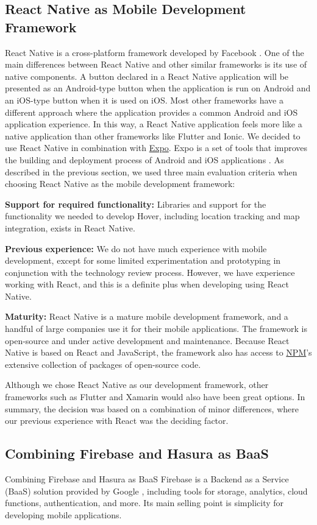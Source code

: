 \subsection{React Native as Mobile Development Framework}
React Native is a cross-platform framework developed by Facebook \citep{occhino_react_2015}. One of the main differences between React Native and other similar frameworks is its use of native components. A button declared in a React Native application will be presented as an Android-type button when the application is run on Android and an iOS-type button when it is used on iOS. Most other frameworks have a different approach where the application provides a common Android and iOS application experience. In this way, a React Native application feels more like a native application than other frameworks like Flutter and Ionic. 
We decided to use React Native in combination with \href{https://expo.io}{Expo}. Expo is a set of tools that improves the building and deployment process of Android and iOS applications \citep{vatne_introduction_2021}. As described in the previous section, we used three main evaluation criteria when choosing React Native as the mobile development framework:

\textbf{Support for required functionality:} Libraries and support for the functionality we needed to develop Hover, including location tracking and map integration, exists in React Native.

\textbf{Previous experience:} We do not have much experience with mobile development, except for some limited experimentation and prototyping in conjunction with the technology review process. However, we have experience working with React, and this is a definite plus when developing using React Native.

\textbf{Maturity:} React Native is a mature mobile development framework, and a handful of large companies use it for their mobile applications. The framework is open-source and under active development and maintenance. Because React Native is based on React and JavaScript, the framework also has access to \href{https://www.npmjs.com}{NPM}’s extensive collection of packages of open-source code.

Although we chose React Native as our development framework, other frameworks such as Flutter and Xamarin would also have been great options. In summary, the decision was based on a combination of minor differences, where our previous experience with React was the deciding factor.

\subsection{Combining Firebase and Hasura as BaaS}
Combining Firebase and Hasura as BaaS
Firebase is a Backend as a Service (BaaS) solution provided by Google \citep{tamplin_firebase_2014}, including tools for storage, analytics, cloud functions, authentication, and more. Its main selling point is simplicity for developing mobile applications.

